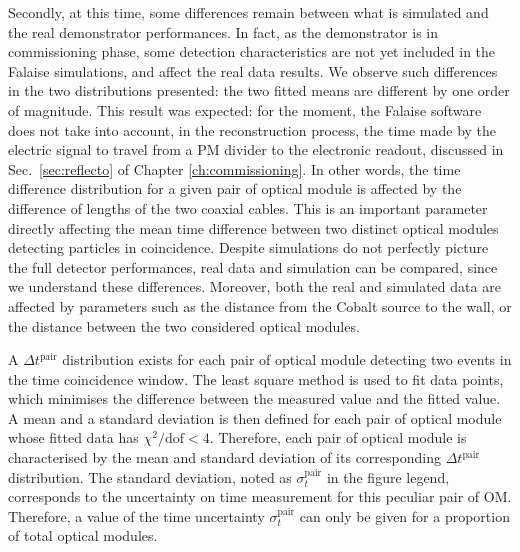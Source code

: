 Secondly, at this time, some differences remain between what is simulated and the real demonstrator performances.
In fact, as the demonstrator is in commissioning phase, some detection characteristics are not yet included in the Falaise simulations, and affect the real data results.
We observe such differences in the two distributions presented: the two fitted means are different by one order of magnitude.
This result was expected: for the moment, the Falaise software does not take into account, in the reconstruction process, the time made by the electric signal to travel from a PM divider to the electronic readout, discussed in Sec.~\ref{sec:reflecto} of Chapter \ref{ch:commissioning}.
In other words, the time difference distribution for a given pair of optical module is affected by the difference of lengths of the two coaxial cables.
This is an important parameter directly affecting the mean time difference between two distinct optical modules detecting particles in coincidence.
Despite simulations do not perfectly picture the full detector performances, real data and simulation can be compared, since we understand these differences.
Moreover, both the real and simulated data are affected by parameters such as the distance from the Cobalt source to the wall, or the distance between the two considered optical modules.

A $\Delta t^{\text{pair}}$ distribution exists for each pair of optical module detecting two events in the time coincidence window.
The least square method is used to fit data points, which minimises the difference between the measured value and the fitted value.
A mean and a standard deviation is then defined for each pair of optical module whose fitted data has $\chi^{2}/\text{dof}<4$.
Therefore, each pair of optical module is characterised by the mean and standard deviation of its corresponding $\Delta t^{\text{pair}}$ distribution.
The standard deviation, noted as $\sigma_{t}^{\text{pair}}$ in the figure legend, corresponds to the uncertainty on time measurement for this peculiar pair of OM.
Therefore, a value of the time uncertainty $\sigma_{t}^{\text{pair}}$ can only be given for a proportion of total optical modules.

